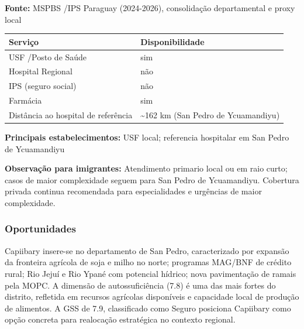 \textbf{Fonte:} MSPBS /\allowbreak  IPS Paraguay (2024-2026), consolidação
departamental e proxy local

{\def\LTcaptype{none} %
\begin{longtable}[]{@{}
  >{\raggedright\arraybackslash}p{}
  >{\raggedright\arraybackslash}p{}@{}}
\toprule\noalign{}
\begin{minipage}[b]{\linewidth}\raggedright
Serviço
\end{minipage} & \begin{minipage}[b]{\linewidth}\raggedright
Disponibilidade
\end{minipage} \\
\midrule\noalign{}
\endhead
\bottomrule\noalign{}
\endlastfoot
USF /\allowbreak  Posto de Saúde & sim \\
Hospital Regional & não \\
IPS (seguro social) & não \\
Farmácia & sim \\
Distância ao hospital de referência & \textasciitilde162 km (San Pedro
de Ycuamandiyu) \\
\end{longtable}
}

\textbf{Principais estabelecimentos:} USF local; referencia hospitalar
em San Pedro de Ycuamandiyu

\textbf{Observação para imigrantes:} Atendimento primario local ou em
raio curto; casos de maior complexidade seguem para San Pedro de
Ycuamandiyu. Cobertura privada continua recomendada para especialidades
e urgências de maior complexidade.
\newpage

\subsubsection*{Oportunidades}\label{oport-capiibary-0217}
Capiibary insere-se no departamento de San Pedro, caracterizado por expansão da fronteira agrícola de soja e milho no norte; programas MAG/BNF de crédito rural; Rio Jejuí e Rio Ypané com potencial hídrico; nova pavimentação de ramais pela MOPC. A dimensão de autossuficiência (7.8) é uma das mais fortes do distrito, refletida em recursos agrícolas disponíveis e capacidade local de produção de alimentos. A GSS de 7.9, classificado como Seguro posiciona Capiibary como opção concreta para realocação estratégica no contexto regional.

